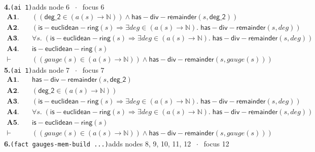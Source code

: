 \documentclass[11pt]{article}
\begin{document}
\medskip\noindent\textbf{4.}\quad \texttt{(ai 1)}\hfill{\small adds node 6 $\;\cdot\;$ focus 6}\\[2pt]
\begin{align*}
  \mathbf{A1.}\quad & ((\mathsf{deg\_2} \in (a(s) \to \mathbb{N})) \wedge \mathsf{has{-}div{-}remainder}(s, \mathsf{deg\_2})) \\
  \mathbf{A2.}\quad & (\mathsf{is{-}euclidean{-}ring}(s) \Rightarrow \exists \mathit{deg} \in (a(s) \to \mathbb{N}).\; \mathsf{has{-}div{-}remainder}(s, \mathit{deg})) \\
  \mathbf{A3.}\quad & \forall s.\; (\mathsf{is{-}euclidean{-}ring}(s) \Rightarrow \exists \mathit{deg} \in (a(s) \to \mathbb{N}).\; \mathsf{has{-}div{-}remainder}(s, \mathit{deg})) \\
  \mathbf{A4.}\quad & \mathsf{is{-}euclidean{-}ring}(s) \\
  \vdash\quad & ((\mathit{gauge}(s) \in (a(s) \to \mathbb{N})) \wedge \mathsf{has{-}div{-}remainder}(s, \mathit{gauge}(s)))
\end{align*}
\medskip\noindent\textbf{5.}\quad \texttt{(ai 1)}\hfill{\small adds node 7 $\;\cdot\;$ focus 7}\\[2pt]
\begin{align*}
  \mathbf{A1.}\quad & \mathsf{has{-}div{-}remainder}(s, \mathsf{deg\_2}) \\
  \mathbf{A2.}\quad & (\mathsf{deg\_2} \in (a(s) \to \mathbb{N})) \\
  \mathbf{A3.}\quad & (\mathsf{is{-}euclidean{-}ring}(s) \Rightarrow \exists \mathit{deg} \in (a(s) \to \mathbb{N}).\; \mathsf{has{-}div{-}remainder}(s, \mathit{deg})) \\
  \mathbf{A4.}\quad & \forall s.\; (\mathsf{is{-}euclidean{-}ring}(s) \Rightarrow \exists \mathit{deg} \in (a(s) \to \mathbb{N}).\; \mathsf{has{-}div{-}remainder}(s, \mathit{deg})) \\
  \mathbf{A5.}\quad & \mathsf{is{-}euclidean{-}ring}(s) \\
  \vdash\quad & ((\mathit{gauge}(s) \in (a(s) \to \mathbb{N})) \wedge \mathsf{has{-}div{-}remainder}(s, \mathit{gauge}(s)))
\end{align*}
\medskip\noindent\textbf{6.}\quad \texttt{(fact gauges-mem-build ...)}\hfill{\small adds nodes 8, 9, 10, 11, 12 $\;\cdot\;$ focus 12}\\[2pt]
\end{document}
